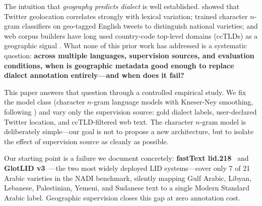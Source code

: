 \documentclass[11pt]{article}
\begin{document}
The intuition that \emph{geography predicts dialect} is well established.
\citet{eisenstein-etal-2010-latent} showed that Twitter geolocation correlates
strongly with lexical variation; \citet{lui-cook-2013-classifying} trained
character $n$-gram classifiers on geo-tagged English tweets to distinguish
national varieties; and web corpus builders have long used country-code
top-level domains (ccTLDs) as a geographic signal
\cite{tiedemann-ljubesic-2012-efficient}.
What none of this prior work has addressed is a systematic question:
\textbf{across multiple languages, supervision sources, and evaluation
conditions, when is geographic metadata good enough to replace dialect
annotation entirely---and when does it fail?}

This paper answers that question through a controlled empirical study.
We fix the model class (character $n$-gram language models with Kneser-Ney
smoothing, following \citet{salameh-etal-2018-fine}) and vary only the
supervision source: gold dialect labels, user-declared Twitter location, and
ccTLD-filtered web text.
The character $n$-gram model is deliberately simple---our goal is not to
propose a new architecture, but to isolate the effect of supervision source
as cleanly as possible.

Our starting point is a failure we document concretely: \textbf{fastText
lid.218}~\cite{joulin-etal-2017-bag,grave-etal-2018-learning} and
\textbf{GlotLID v3}~\cite{kargaran-etal-2023-glotlid}---the two most
widely deployed LID systems---cover only 7 of 21 Arabic varieties in the
NADI benchmark, silently mapping Gulf Arabic, Libyan, Lebanese, Palestinian,
Yemeni, and Sudanese text to a single Modern Standard Arabic label.
Geographic supervision closes this gap at zero annotation cost.
\end{document}
